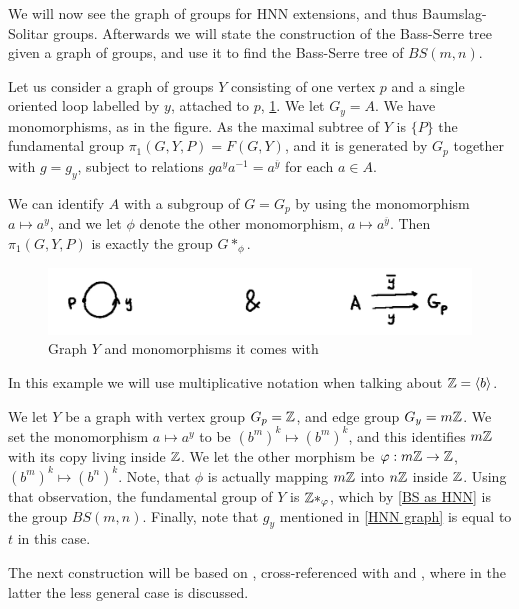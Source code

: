 We will now see the graph of groups for HNN extensions, and thus Baumslag-Solitar groups. Afterwards we will state the construction of the Bass-Serre tree given a graph of groups, and use it to find the Bass-Serre tree of $BS(m,n)$.


\begin{example}\cite[section I.5.1]{Ser80}\label{HNN graph}
    Let us consider a graph of groups $Y$ consisting of one vertex $p$ and a single oriented loop labelled by $y$, attached to $p$, \ref{loopHNN}. We let $G_y = A$. We have monomorphisms, as in the figure. As the maximal subtree of $Y$ is $\{P\}$ the fundamental group $\pi_1(G,Y,P) = F(G,Y)$, and it is generated by $G_p$ together with $g = g_y$, subject to relations $ga^ya^{-1} = a^{\overline{y}}$ for each $a \in A$.

    We can identify $A$ with a subgroup of $G = G_p$ by using the monomorphism $a \mapsto a^y$, and we let $\phi$ denote the other monomorphism, $a \mapsto a^{\overline{y}}$. Then $\pi_1(G,Y,P)$ is exactly the group $G \ast _\phi$.
\end{example}

\begin{figure}[h]
    \centering
    \includegraphics[width=0.5\linewidth]{sections/alicja/HNN loop and monomorphisms.jpeg}
    \caption{Graph $Y$ and monomorphisms it comes with}
    \label{loopHNN}
\end{figure}

\begin{importantexample} \label{BS graph} In this example we will use multiplicative notation when talking about $\mathbb{Z} = \langle b \rangle$. 

We let $Y$ be a graph with vertex group $G_p = \mathbb{Z}$, and edge group $G_y = m\mathbb{Z}$. We set the monomorphism $a \mapsto a^y$ to be $(b^m)^k \mapsto (b^m)^k$, and this identifies $m\mathbb{Z}$ with its copy living inside $\mathbb{Z}$. We let the other morphism be $\varphi: m\mathbb{Z} \to \mathbb{Z}$, $(b^m)^k \mapsto (b^n)^k$. Note, that $\phi$ is actually mapping $m\mathbb{Z}$ into $n\mathbb{Z}$ inside $\mathbb{Z}$. Using that observation, the fundamental group of $Y$ is $\mathbb{Z} \ast _\varphi$, which by \ref{BS as HNN} is the group $BS(m,n)$. Finally, note that $g_y$ mentioned in \ref{HNN graph} is equal to $t$ in this case.
\end{importantexample}

The next construction will be based on \cite[pages 23-24]{GoPaXi24}, cross-referenced with \cite{Wil} and \cite{BajoHNN}, where in the latter the less general case is discussed.

